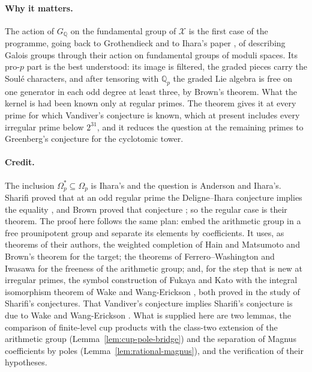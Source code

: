\documentclass[11pt]{article}
\theoremstyle{definition}
\numberwithin{equation}{section}
\begin{document}
\paragraph{Why it matters.}
The action of $G_{\mathbb Q}$ on the fundamental group of $\mathcal X$ is the first case of the programme, going
back to Grothendieck and to Ihara's paper \cite{Ihara1986}, of describing Galois groups through their action on
fundamental groups of moduli spaces. Its pro-$p$ part is the best understood: its image is filtered, the graded
pieces carry the Soul\'e characters, and after tensoring with $\mathbb Q_p$ the graded Lie algebra is free on one
generator in each odd degree at least three, by Brown's theorem. What the kernel is had been known only at regular
primes. The theorem gives it at every prime for which Vandiver's conjecture is known, which at present includes
every irregular prime below $2^{31}$, and it reduces the question at the remaining primes to Greenberg's
conjecture for the cyclotomic tower.

\paragraph{Credit.}
The inclusion $\Omega_p^*\subseteq\Omega_p$ is Ihara's and the question is Anderson and Ihara's. Sharifi proved
that at an odd regular prime the Deligne--Ihara conjecture implies the equality \cite[Theorem 1.1, p.~2]{Sharifi2002},
and Brown proved that conjecture \cite[Theorem 1.1]{Brown2012}; so the regular case is their theorem. The proof
here follows the same plan: embed the arithmetic group in a free prounipotent group and separate its elements by
coefficients. It uses, as theorems of their authors, the weighted completion of Hain and Matsumoto
\cite{HainMatsumoto2001} and Brown's theorem for the target; the theorems of Ferrero--Washington
\cite{FerreroWashington1979} and Iwasawa \cite{Iwasawa1981} for the freeness of the arithmetic group; and, for the
step that is new at irregular primes, the symbol construction of Fukaya and Kato \cite{FukayaKato2012} with the
integral isomorphism theorem of Wake and Wang-Erickson \cite{WakeWangEricksonPseudo2018}, both proved in the
study of Sharifi's conjectures. That Vandiver's conjecture implies Sharifi's conjecture is due to Wake and
Wang-Erickson \cite[abstract and Corollary~5.1.2]{WakeWangErickson2017}. What is supplied here are two lemmas, the comparison of finite-level cup products
with the class-two extension of the arithmetic group (Lemma~\ref{lem:cup-pole-bridge}) and the separation of
Magnus coefficients by poles (Lemma~\ref{lem:rational-magnus}), and the verification of their hypotheses.
\end{document}

